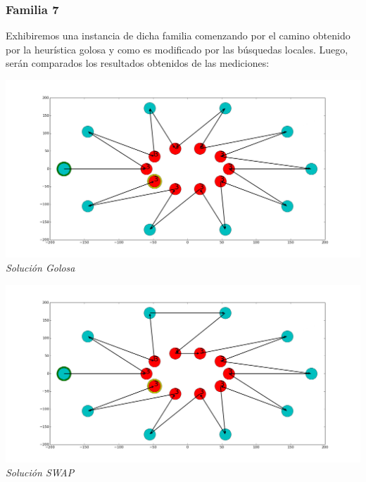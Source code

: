 \subsubsection*{Familia 7}

Exhibiremos una instancia de dicha familia comenzando por el camino obtenido por la heur\'istica golosa y como es modificado por las búsquedas locales. Luego, serán comparados los resultados obtenidos de las mediciones:

\vspace*{0.3cm} \vspace*{0.3cm}
  \begin{center}
 \includegraphics[scale=0.3]{./EJ3/anillosgoloso.png}\\
 {            \textit{Soluci\'on Golosa}}
  \end{center}
  \vspace*{0.3cm}

\vspace*{0.3cm} \vspace*{0.3cm}
  \begin{center}
 \includegraphics[scale=0.3]{./EJ3/anillosswap.png}\\
 {            \textit{Soluci\'on SWAP}}
  \end{center}
  \vspace*{0.3cm}

